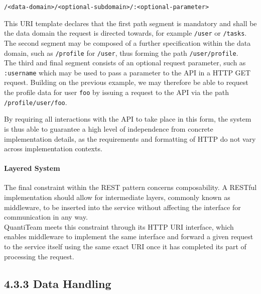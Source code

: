 \documentclass[12pt]{report}
\let\oldparagraph\paragraph
\renewcommand{\paragraph}[1]{\oldparagraph{#1}\mbox{}}
\begin{document}
\texttt{/\textless{}data-domain\textgreater{}/\textless{}optional-subdomain\textgreater{}/:\textless{}optional-parameter\textgreater{}}

This URI template declares that the first path segment is mandatory and
shall be the data domain the request is directed towards, for example
\texttt{/user} or \texttt{/tasks}.\\
The second segment may be composed of a further specification within the
data domain, such as \texttt{/profile} for \texttt{/user}, thus forming
the path \texttt{/user/profile}.\\
The third and final segment consists of an optional request parameter,
such as \texttt{:username} which may be used to pass a parameter to the
API in a HTTP GET request. Building on the previous example, we may
therefore be able to request the profile data for user \texttt{foo} by
issuing a request to the API via the path \texttt{/profile/user/foo}.

By requiring all interactions with the API to take place in this form,
the system is thus able to guarantee a high level of independence from
concrete implementation details, as the requirements and formatting of
HTTP do not vary across implementation contexts.

\paragraph{Layered System}\label{layered-system}

The final constraint within the REST pattern concerns composability. A
RESTful implementation should allow for intermediate layers, commonly
known as middleware, to be inserted into the service without affecting
the interface for communication in any
way\cite{1rest}.\\
QuantiTeam meets this constraint through its HTTP URI interface, which
enables middleware to implement the same interface and forward a given
request to the service itself using the same exact URI once it has
completed its part of processing the request.

\subsection{4.3.3 Data Handling}\label{data-handling}
\end{document}
